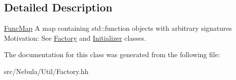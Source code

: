 \subsection{Detailed Description}
\hyperlink{classNeb_1_1FuncMap}{Func\-Map} A map containing {\ttfamily std\-::function} objects with arbitrary signatures Motivation\-: See \hyperlink{classNeb_1_1Factory}{Factory} and \hyperlink{classNeb_1_1Initializer}{Initializer} classes. 

The documentation for this class was generated from the following file\-:\begin{DoxyCompactItemize}
\item 
src/\-Nebula/\-Util/Factory.\-hh\end{DoxyCompactItemize}
